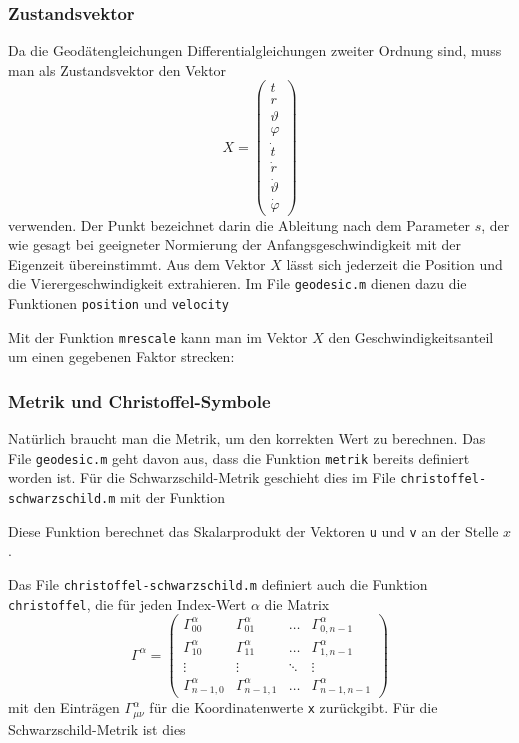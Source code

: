 \subsubsection{Zustandsvektor}
Da die Geodätengleichungen Differentialgleichungen zweiter Ordnung sind,
muss man als Zustandsvektor den Vektor
\[
X=\begin{pmatrix}
t\\r\\\vartheta\\\varphi \\\dot t\\\dot r\\\dot \vartheta\\\dot\varphi
\end{pmatrix}
\]
verwenden.
Der Punkt bezeichnet darin die Ableitung nach dem Parameter $s$, der
wie gesagt bei geeigneter Normierung der Anfangsgeschwindigkeit mit
der Eigenzeit übereinstimmt.
Aus dem Vektor $X$ lässt sich jederzeit die Position und die
Vierergeschwindigkeit extrahieren.
Im File \texttt{geodesic.m} dienen dazu die Funktionen
\texttt{position} und \texttt{velocity}

Mit der Funktion \texttt{mrescale} kann man im Vektor $X$ den
Geschwindigkeitsanteil um einen gegebenen Faktor strecken:


\subsubsection{Metrik und Christoffel-Symbole}
Natürlich braucht man die Metrik, um den korrekten Wert zu berechnen.
Das File \texttt{geodesic.m} geht davon aus, dass die Funktion \texttt{metrik}
bereits definiert worden ist.
Für die Schwarzschild-Metrik geschieht dies im File
\texttt{christoffel-schwarzschild.m} mit der Funktion

Diese Funktion berechnet das Skalarprodukt der Vektoren \texttt{u} und
\texttt{v} an der Stelle $x$.

Das File \texttt{christoffel-schwarzschild.m} definiert auch die Funktion
\texttt{christoffel}, die für jeden Index-Wert $\alpha$ die Matrix
\[
\Gamma^\alpha
=
\begin{pmatrix}
\Gamma^\alpha_{00}   &\Gamma^\alpha_{01}   &\dots &\Gamma^\alpha_{0,n-1}  \\
\Gamma^\alpha_{10}   &\Gamma^\alpha_{11}   &\dots &\Gamma^\alpha_{1,n-1}  \\
\vdots               &\vdots               &\ddots&\vdots                 \\
\Gamma^\alpha_{n-1,0}&\Gamma^\alpha_{n-1,1}&\dots &\Gamma^\alpha_{n-1,n-1}
\end{pmatrix}
\]
mit
den Einträgen $\Gamma^\alpha_{\mu\nu}$ für die Koordinatenwerte \texttt{x}
zurückgibt.
Für die Schwarzschild-Metrik ist dies


